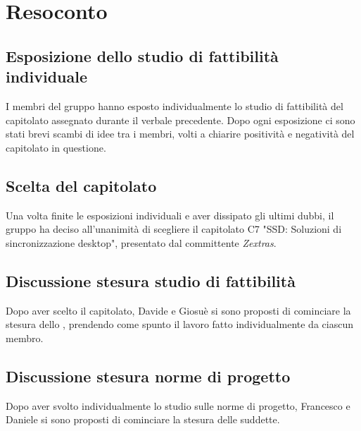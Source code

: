 \newpage


\section{Resoconto}

\subsection{Esposizione dello studio di fattibilità individuale }

I membri del gruppo hanno esposto individualmente lo studio di fattibilità del capitolato assegnato durante il verbale precedente. Dopo ogni esposizione ci sono stati brevi scambi di idee tra i membri, volti a chiarire positività e negatività del capitolato in questione.

\subsection{Scelta del capitolato}

Una volta finite le esposizioni individuali e aver dissipato gli ultimi dubbi,  il gruppo ha deciso all'unanimità di scegliere il capitolato C7 "SSD: Soluzioni di sincronizzazione desktop",  presentato dal committente \textit{Zextras}.

\subsection{Discussione stesura studio di fattibilità}

Dopo aver scelto il capitolato,  Davide e Giosuè si sono proposti di cominciare la stesura dello \SdF, prendendo come spunto il lavoro fatto individualmente da ciascun membro.

\subsection{Discussione stesura norme di progetto}

Dopo aver svolto individualmente lo studio sulle norme di progetto, Francesco e Daniele si sono proposti di cominciare la stesura delle suddette.


\newpage

